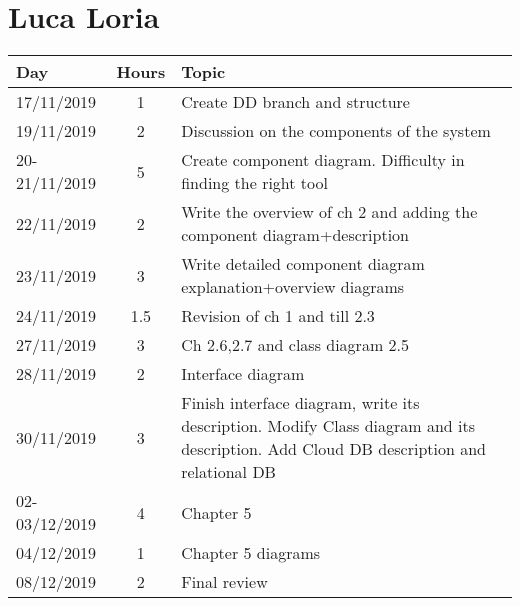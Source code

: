 \section{Luca Loria}
\begin{table}[H]
    \centering
    \begin{tabularx}{\textwidth}{ |l|c|X| }
        \hline
        Day & Hours & Topic \\
        \hline
        17/11/2019 & 1 & Create DD branch and structure \\								
        \hline
        19/11/2019 & 2	& Discussion on the components of the system \\
        \hline
        20-21/11/2019 & 5	& Create component diagram. Difficulty in finding the right tool \\
        \hline								
        22/11/2019 & 2	& Write the overview of ch 2 and adding the component diagram+description \\									
        \hline
        23/11/2019 & 3 & Write detailed component diagram explanation+overview diagrams \\									
        \hline
        24/11/2019 & 1.5 & Revision of ch 1 and till 2.3 \\									
        \hline
        27/11/2019 & 3	& Ch 2.6,2.7 and class diagram 2.5 \\									
        \hline
        28/11/2019 & 2 & Interface diagram \\									
        \hline
        30/11/2019 & 3 & Finish interface diagram, write its description. Modify Class diagram and its description. Add Cloud DB description and relational DB \\									
        \hline
        02-03/12/2019 & 4 & Chapter 5 \\									
        \hline
        04/12/2019 & 1 & Chapter 5 diagrams \\									
        \hline
        08/12/2019 & 2 & Final review \\						
        \hline						
    \end{tabularx}
  \end{table}
